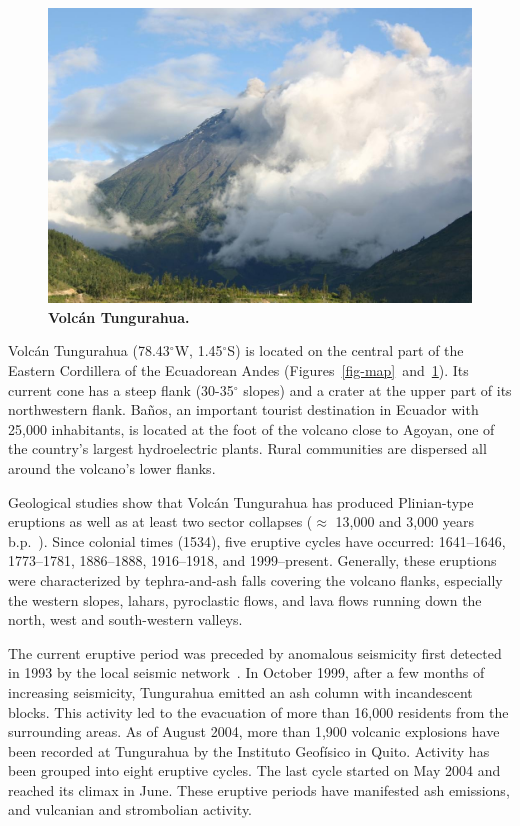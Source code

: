 \begin{figure}[t]
\begin{center}
\includegraphics[width=0.9\hsize]{./figures/pics/tungurahua1.jpg}
\end{center}
\caption{\small {\bf Volc\'{a}n Tungurahua.}}
\label{fig-tungurahua}
\end{figure}

Volc\'{a}n Tungurahua (78.43$^\circ$W, 1.45$^\circ$S) is located on the
central part of the Eastern Cordillera of the Ecuadorean Andes
(Figures~\ref{fig-map}~and~\ref{fig-tungurahua}). Its current cone
has a steep flank (30-35$^\circ$ slopes) and a crater at the upper part of
its northwestern flank. Ba\~{n}os, an important tourist destination in
Ecuador with 25,000 inhabitants, is located at the foot of the volcano
close to Agoyan, one of the country's largest hydroelectric plants. Rural
communities are dispersed all around the volcano's lower flanks.

Geological studies show that Volc\'{a}n Tungurahua has produced Plinian-type
eruptions as well as at least two sector collapses ($\approx$ 13,000 
and 3,000 years b.p.~\cite{Hall99}). Since colonial times (1534), 
five eruptive cycles have occurred: 1641--1646, 1773--1781, 1886--1888,
1916--1918, and 1999--present. Generally, these eruptions were
characterized by tephra-and-ash falls covering the volcano flanks,
especially the western slopes, lahars, pyroclastic flows, and 
lava flows running down the north, west and south-western
valleys.

The current eruptive period was preceded by anomalous
seismicity first detected in 1993 by the local seismic
network~\cite{Ruiz94}.
In October 1999, after a few months of increasing
seismicity, Tungurahua emitted an ash column with incandescent blocks.
This activity led to the evacuation of more than 16,000 residents from
the surrounding areas.  As of August 2004, more than 1,900 volcanic
explosions have been recorded at Tungurahua by the Instituto Geof\'{i}sico
in Quito.  Activity has been grouped into eight eruptive cycles. The
last cycle started on May 2004 and reached its climax in June. These
eruptive periods have manifested ash emissions, and vulcanian and
strombolian activity. 

